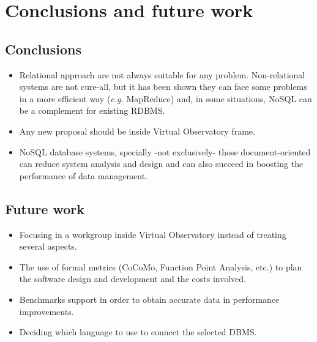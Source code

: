 \chapter{Conclusions and future work} %
\label{cha:conclusions_and_future_work}

\section{Conclusions} %
\label{sec:conclusions}

\begin{itemize}

\item Relational approach are not always suitable for any problem. Non-relational systems are not cure-all, but it has been shown they can face some problems in a more efficient way (\textit{e.g.} MapReduce) and, in some situations, NoSQL can be a complement for existing RDBMS.

\item Any new proposal should be inside Virtual Observatory frame.

\item NoSQL database systems, specially -not exclusively- those document-oriented can reduce system analysis and design and can also succeed in boosting the performance of data management.

\end{itemize}


\section{Future work} %
\label{sec:future_work}

\begin{itemize}

\item Focusing in a workgroup inside Virtual Observatory instead of treating several aspects.

\item The use of formal metrics (CoCoMo, Function Point Analysis, etc.) to plan the software design and development and the costs involved.

\item Benchmarks support in order to obtain accurate data in performance improvements.

\item Deciding which language to use to connect the selected DBMS.

\end{itemize}



